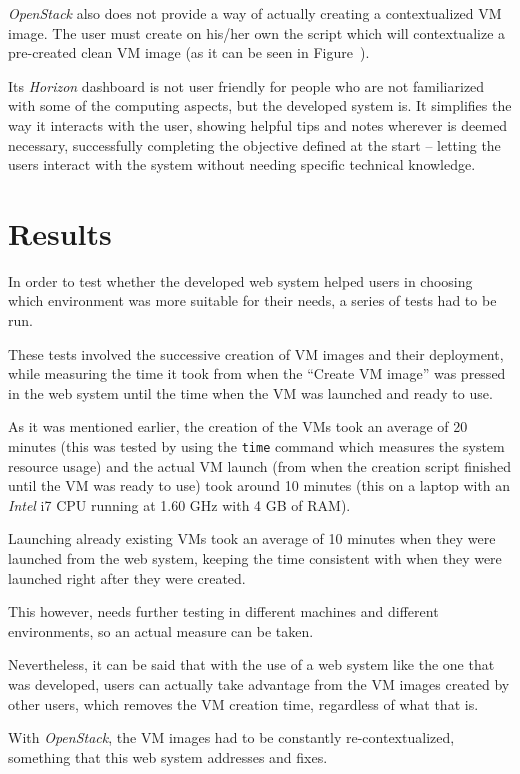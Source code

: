 \textit{OpenStack} also does not provide a way of actually creating a contextualized VM image. The user must create on his/her own the script which will contextualize a pre-created clean VM image (as it can be seen in Figure~). 

Its \textit{Horizon} dashboard is not user friendly for people who are not familiarized with some of the computing aspects, but the developed system is. It simplifies the way it interacts with the user, showing helpful tips and notes wherever is deemed necessary, successfully completing the objective defined at the start -- letting the users interact with the system without needing specific technical knowledge.

\section{Results}\label{sec:results}

In order to test whether the developed web system helped users in choosing which environment was more suitable for their needs, a series of tests had to be run.

These tests involved the successive creation of VM images and their deployment, while measuring the time it took from when the ``Create VM image'' was pressed in the web system until the time when the VM was launched and ready to use.

As it was mentioned earlier, the creation of the VMs took an average of 20 minutes (this was tested by using the \texttt{time} command which measures the system resource usage) and the actual VM launch (from when the creation script finished until the VM was ready to use) took around 10 minutes (this on a laptop with an \textit{Intel} i7 CPU running at 1.60 GHz with 4 GB of RAM).

Launching already existing VMs took an average of 10 minutes when they were launched from the web system, keeping the time consistent with when they were launched right after they were created.

This however, needs further testing in different machines and different environments, so an actual measure can be taken.

Nevertheless, it can be said that with the use of a web system like the one that was developed, users can actually take advantage from the VM images created by other users, which removes the VM creation time, regardless of what that is.

With \textit{OpenStack}, the VM images had to be constantly re-contextualized, something that this web system addresses and fixes.

